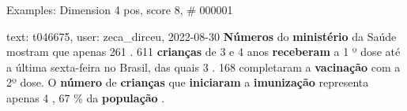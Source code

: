 \begin{frame}{Examples: Dimension 4 pos, score 8, \# 000001}
\footnotesize
\begin{exampleblock}{text: t046675, user: zeca\_dirceu, 2022-08-30}
\textbf{Números} do \textbf{ministério} da Saúde mostram que apenas 261 . 611 
\textbf{crianças} de 3 e 4 anos \textbf{receberam} a 1 º dose até a última 
sexta-feira no Brasil, das quais 3 . 168 completaram a \textbf{vacinação} com a 
2º dose. O \textbf{número} de \textbf{crianças} que \textbf{iniciaram} a 
\textbf{imunização} representa apenas 4 , 67 \% da \textbf{população} . 
\end{exampleblock}
\end{frame}
